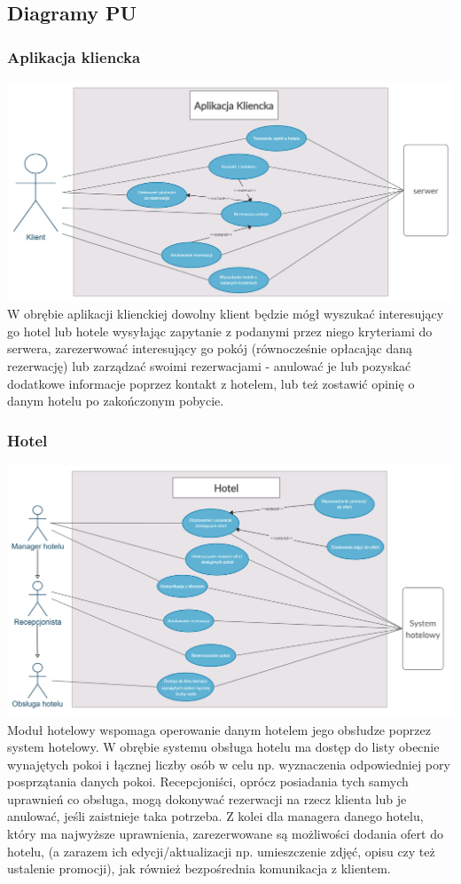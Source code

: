 \documentclass{article}
\begin{document}
\subsection{Diagramy PU}
\subsubsection{Aplikacja kliencka}
\includegraphics[width=\linewidth]{checkpoint1/Use cases - klient.png}
\indent W obrębie aplikacji klienckiej dowolny klient będzie mógł wyszukać interesujący go hotel lub hotele wysyłając zapytanie z podanymi przez niego kryteriami do serwera, zarezerwować interesujący go pokój (równocześnie opłacając daną rezerwację) lub zarządzać swoimi rezerwacjami - anulować je lub pozyskać dodatkowe informacje poprzez kontakt z hotelem, lub też zostawić opinię o danym hotelu po zakończonym pobycie.

\subsubsection{Hotel}
\includegraphics[width=\linewidth]{checkpoint1/Use cases - hotel.png}
\indent Moduł hotelowy wspomaga operowanie danym hotelem jego obsłudze poprzez system hotelowy. W obrębie systemu obsługa hotelu ma dostęp do listy obecnie wynajętych pokoi i łącznej liczby osób w celu np. wyznaczenia odpowiedniej pory posprzątania danych pokoi.
Recepcjoniści, oprócz posiadania tych samych uprawnień co obsługa, mogą dokonywać rezerwacji na rzecz klienta lub je anulować, jeśli zaistnieje taka potrzeba.
Z kolei dla managera danego hotelu, który ma najwyższe uprawnienia, zarezerwowane są możliwości dodania ofert do hotelu, (a zarazem ich edycji/aktualizacji np. umieszczenie zdjęć, opisu czy też ustalenie promocji), jak również bezpośrednia komunikacja z klientem.
\end{document}
